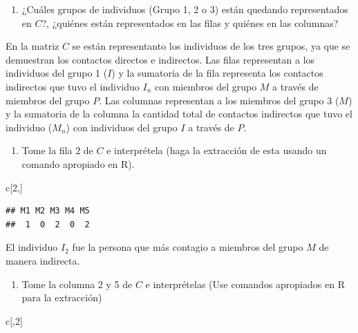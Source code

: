 \documentclass[]{article}
\newenvironment{Shaded}{\begin{snugshade}}{\end{snugshade}}
\newcommand{\DecValTok}[1]{\textcolor[rgb]{0.00,0.00,0.81}{#1}}
\newcommand{\NormalTok}[1]{#1}
\providecommand{\tightlist}{%
  \setlength{\itemsep}{0pt}\setlength{\parskip}{0pt}}
\begin{document}
\begin{enumerate}
\def\labelenumi{\alph{enumi}.}
\setcounter{enumi}{1}
\tightlist
\item
  ¿Cuáles grupos de individuos (Grupo 1, 2 o 3) están quedando
  representados en \(C\)?, ¿quiénes están representados en las filas y
  quiénes en las columnas?
\end{enumerate}

En la matriz \(C\) se están representanto los individuos de los tres
grupos, ya que se demuestran los contactos directos e indirectos. Las
filas representan a los individuos del grupo 1 (\(I\)) y la sumatoria de
la fila representa los contactos indirectos que tuvo el individuo
\(I_n\) con miembros del grupo \(M\) a través de miembros del grupo
\(P\). Las columnas representan a los miembros del grupo 3 (\(M\)) y la
sumatoria de la columna la cantidad total de contactos indirectos que
tuvo el individuo (\(M_n\)) con individuos del grupo \(I\) a través de
\(P\).

\begin{enumerate}
\def\labelenumi{\alph{enumi}.}
\setcounter{enumi}{2}
\tightlist
\item
  Tome la fila 2 de \(C\) e interprétela (haga la extracción de esta
  usando un comando apropiado en R).
\end{enumerate}

\begin{Shaded}
\begin{Highlighting}[]
\NormalTok{c[}\DecValTok{2}\NormalTok{,]}
\end{Highlighting}
\end{Shaded}

\begin{verbatim}
## M1 M2 M3 M4 M5 
##  1  0  2  0  2
\end{verbatim}

El individuo \(I_{2}\) fue la persona que más contagio a miembros del
grupo \(M\) de manera indirecta.

\begin{enumerate}
\def\labelenumi{\alph{enumi}.}
\setcounter{enumi}{3}
\tightlist
\item
  Tome la columna 2 y 5 de \(C\) e interprételas (Use comandos
  apropiados en R para la extracción)
\end{enumerate}

\begin{Shaded}
\begin{Highlighting}[]
\NormalTok{c[,}\DecValTok{2}\NormalTok{]}
\end{Highlighting}
\end{Shaded}
\end{document}
